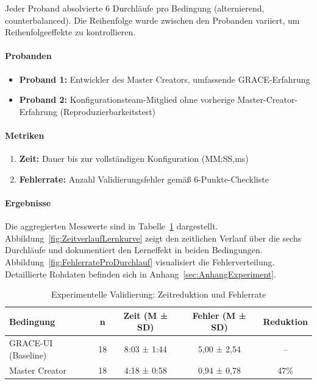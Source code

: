 Jeder Proband absolvierte 6 Durchläufe pro Bedingung (alternierend, counterbalanced). Die Reihenfolge wurde zwischen den Probanden variiert, um Reihenfolgeeffekte zu kontrollieren.

\paragraph{Probanden}
\begin{itemize}
    \item \textbf{Proband 1:} Entwickler des Master Creators, umfassende GRACE-Erfahrung
    \item \textbf{Proband 2:} Konfigurationsteam-Mitglied ohne vorherige Master-Creator-Erfahrung (Reproduzierbarkeitstest)
\end{itemize}

\paragraph{Metriken}
\begin{enumerate}
    \item \textbf{Zeit:} Dauer bis zur vollständigen Konfiguration (MM:SS,ms)
    \item \textbf{Fehlerrate:} Anzahl Validierungsfehler gemäß 6-Punkte-Checkliste
\end{enumerate}

\paragraph{Ergebnisse}
Die aggregierten Messwerte sind in Tabelle~\ref{tab:ExperimentErgebnisse} dargestellt. Abbildung~\ref{fig:ZeitverlaufLernkurve} zeigt den zeitlichen Verlauf über die sechs Durchläufe und dokumentiert den Lerneffekt in beiden Bedingungen. Abbildung~\ref{fig:FehlerrateProDurchlauf} visualisiert die Fehlerverteilung. Detaillierte Rohdaten befinden sich in Anhang~\ref{sec:AnhangExperiment}.

\begin{table}[h]
\centering
\caption{Experimentelle Validierung: Zeitreduktion und Fehlerrate}
\label{tab:ExperimentErgebnisse}
\begin{tabular}{lcccc}
\hline
\textbf{Bedingung} & \textbf{n} & \textbf{Zeit (M ± SD)} & \textbf{Fehler (M ± SD)} & \textbf{Reduktion} \\
\hline
GRACE-UI (Baseline) & 18 & 8:03 ± 1:44 & 5,00 ± 2,54 & -- \\
Master Creator & 18 & 4:18 ± 0:58 & 0,94 ± 0,78 & 47\% \\
\hline
\end{tabular}
\end{table}


